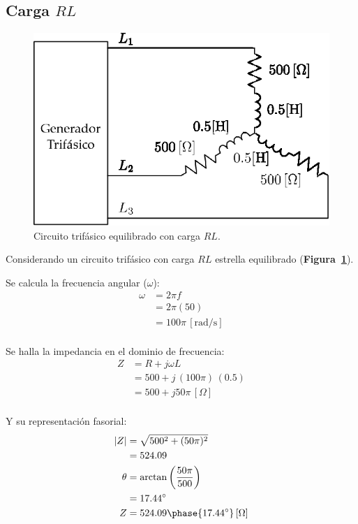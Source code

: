 \documentclass[letter,11pt]{article}
\begin{document}
\subsection{Carga $RL$}
\begin{figure}[!h]
\centering
\includegraphics[scale=0.95]{figura1.eps}
\caption{Circuito trifásico equilibrado con carga $RL$.}
\label{circuito1}
\end{figure}

Considerando un circuito trifásico con carga $RL$ estrella equilibrado
(\textbf{Figura~\ref{circuito1}}).

Se calcula la frecuencia angular ($\omega$):
\begin{equation*}
    \begin{split}
        \omega&=2\pi f\\
              &=2\pi(50)\\
              &=100\pi\,[\text{rad}/\text{s}]\\
    \end{split}
\end{equation*}

Se halla la impedancia en el dominio de frecuencia:
\begin{equation*}
    \begin{split}
        Z &= R+j\omega L\\
          &= 500+j\,(100\pi)\,(0.5)\\
          &= 500+j50\pi\,[\Omega]\\
    \end{split}
\end{equation*}

Y su representación fasorial:
\begin{equation*}
    \begin{split}
        |Z| &= \sqrt{500^2+(50\pi)^2}\\
            &= 524.09\\
        \theta &= \arctan\left(\frac{50\pi}{500}\right)\\
               &= 17.44^{\circ}\\
        Z &= 524.09\phase{17.44^{\circ}}\,[\Omega]\\
    \end{split}
\end{equation*}
\end{document}
